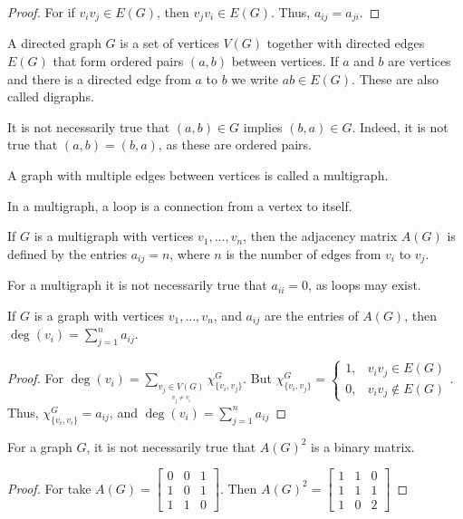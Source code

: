 \documentclass[crop=false,class=book]{standalone}
\begin{document}
\begin{proof}
For if $v_iv_j \in E(G)$, then $v_j v_i \in E(G)$. Thus, $a_{ij} = a_{ji}$.
\end{proof}
\begin{definition}
A directed graph $G$ is a set of vertices $V(G)$ together with directed edges $E(G)$ that form ordered pairs $(a,b)$ between vertices. If $a$ and $b$ are vertices and there is a directed edge from $a$ to $b$ we write $ab \in E(G)$. These are also called digraphs.
\end{definition}
\begin{remark}
It is not necessarily true that $(a,b) \in G$ implies $(b,a) \in G$. Indeed, it is not true that $(a,b) = (b,a)$, as these are ordered pairs.
\end{remark}
\begin{definition}
A graph with multiple edges between vertices is called a multigraph.
\end{definition}
\begin{definition}
In a multigraph, a loop is a connection from a vertex to itself.
\end{definition}
\begin{definition}
If $G$ is a multigraph with vertices $v_1,\hdots, v_n$, then the adjacency matrix $A(G)$ is defined by the entries $a_{ij} = n$, where $n$ is the number of edges from $v_i$ to $v_j$. 
\end{definition}
\begin{remark}
For a multigraph it is not necessarily true that $a_{ii}=0$, as loops may exist.
\end{remark}
\begin{corollary}
If $G$ is a graph with vertices $v_1,\hdots, v_n$, and $a_{ij}$ are the entries of $A(G)$, then $\deg(v_i) = \sum_{j=1}^{n} a_{ij}$.
\end{corollary}
\begin{proof}
For $\deg(v_i) = \sum_{\underset{v_j\ne v_i}{v_j\in V(G)}}\chi_{\{v_i,v_j\}}^G$. But $\chi_{\{v_i,v_j\}}^G = \begin{cases} 1, & v_iv_j\in E(G)\\ 0, & v_iv_j \notin E(G)\end{cases}$. Thus, $\chi_{\{v_i,v_i\}}^G = a_{ij}$, and $\deg(v_i) = \sum_{j=1}^{n} a_{ij}$
\end{proof}
\begin{theorem}
For a graph $G$, it is not necessarily true that $A(G)^2$ is a binary matrix.
\end{theorem}
\begin{proof}
For take $A(G) = \begin{bmatrix} 0 & 0 & 1 \\ 1 & 0 & 1 \\ 1& 1 & 0 \end{bmatrix}$. Then $A(G)^2 = \begin{bmatrix} 1 & 1 & 0 \\ 1 & 1 & 1 \\ 1 & 0 & 2 \end{bmatrix}$
\end{proof}
\end{document}
